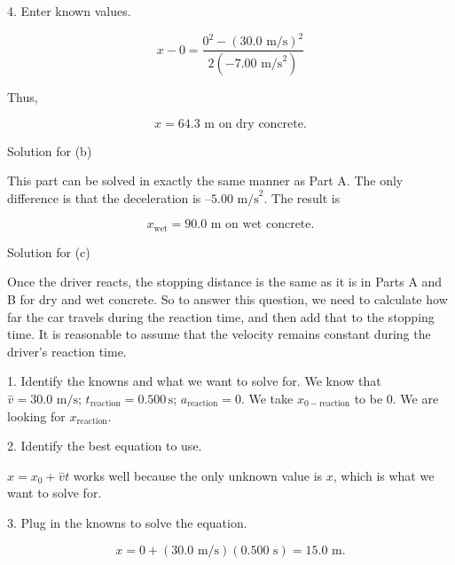 \documentclass[
]{book}
\newenvironment{tinysection}{}{}
\begin{document}
4. Enter known values.

\leavevmode\hypertarget{import-auto-id2293184}{}%
\[{{x - 0} = \frac{0^{2} - \left( {\text{30}\text{.}\text{0\ m/s}} \right)^{2}}{2\left( {{- 7}\text{.}\text{00\ m/s}^{2}} \right)}}{}\]

Thus,

\leavevmode\hypertarget{import-auto-id2293155}{}%
\[{{x = \text{64}}\text{.}\text{3\ m\ on\ dry\ concrete}\text{.}}{}\]

\begin{tinysection}

{Solution for (b)}

\end{tinysection}

This part can be solved in exactly the same manner as Part A. The only
difference is that the deceleration is
\({{–5}\text{.}\text{00\ m/s}^{2}}{}\). The result is

\leavevmode\hypertarget{import-auto-id2178635}{}%
\[{{x_{\text{wet}} = \text{90}}\text{.}\text{0\ m\ on\ wet\ concrete}\text{.}}{}\]

\begin{tinysection}

{Solution for (c)}

\end{tinysection}

Once the driver reacts, the stopping distance is the same as it is in
Parts A and B for dry and wet concrete. So to answer this question, we
need to calculate how far the car travels during the reaction time, and
then add that to the stopping time. It is reasonable to assume that the
velocity remains constant during the driver's reaction time.

1. Identify the knowns and what we want to solve for. We know that
\(\overset{-}{v} = \text{30.0\ m/s}\);
\(t_{\text{reaction}} = 0.500\,\text{s}\); \(a_{\text{reaction}} = 0\). We
take \(x_{0 - \text{reaction}}\) to be 0. We are looking for
\(x_{\text{reaction}}{}\).

2. Identify the best equation to use.

\({{x = {x_{0} + \overset{-}{v}}}t}{}\) works well because the only
unknown value is \(x{}\), which is what we want to solve for.

3. Plug in the knowns to solve the equation.

\leavevmode\hypertarget{import-auto-id2175306}{}%
\[{{{x = {0 + \left( {\text{30}\text{.}\text{0\ m/s}} \right)}}{\left( {0\text{.}\text{500\ s}} \right) = \text{15}}\text{.}\text{0\ m}}.}{}\]
\end{document}

